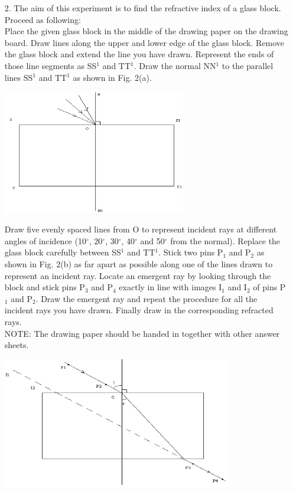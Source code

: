 \begin{enumerate}
\item[2.] The aim of this experiment is to find the refractive index of a glass block. Proceed as following:\\[10pt]

Place the given glass block in the middle of the drawing paper on the drawing board. Draw lines along the upper and lower edge of the glass block. Remove the glass block and extend the line you have drawn. Represent the ends of those line segments as SS$^1$ and TT$^1$. Draw the normal NN$^1$ to the parallel lines SS$^1$ and TT$^1$ as shown in Fig. 2(a).

\begin{center}
\includegraphics[width=8cm]{./img/2007-2a-alt.png}
\end{center}

Draw five evenly spaced lines from O to represent incident rays at different angles of incidence (10$^\circ$, 20$^\circ$, 30$^\circ$, 40$^\circ$ and 50$^\circ$ from the normal). Replace the glass block carefully between SS$^1$ and TT$^1$. Stick two pins P$_1$ and P$_2$ as shown in Fig. 2(b) as far apart as possible along one of the lines drawn to represent an incident ray. Locate an emergent ray by looking through the block and stick pins P$_3$ and P$_4$ exactly in line with images I$_1$ and I$_2$ of pins P$_1$ and P$_2$. Draw the emergent ray and repeat the procedure for all the incident rays you have drawn. Finally draw in the corresponding refracted rays.\\[10pt]

NOTE: The drawing paper should be handed in together with other answer sheets.

\begin{center}
\includegraphics[width=10cm]{./img/2007-2b-alt.png}
\end{center}


\end{enumerate}
